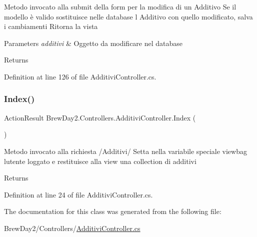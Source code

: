 Metodo invocato alla submit della form per la modifica di un Additivo Se il modello è valido sostituisce nelle database l\textquotesingle{} Additivo con quello modificato, salva i cambiamenti Ritorna la vista 


\begin{DoxyParams}{Parameters}
{\em additivi} & Oggetto da modificare nel database\\
\hline
\end{DoxyParams}
\begin{DoxyReturn}{Returns}

\end{DoxyReturn}


Definition at line 126 of file Additivi\+Controller.\+cs.

\mbox{\label{class_brew_day2_1_1_controllers_1_1_additivi_controller_abc59038a7b58a22f8300921d8c0fe72e}} 
\subsubsection{\texorpdfstring{Index()}{Index()}}
{\footnotesize\ttfamily Action\+Result Brew\+Day2.\+Controllers.\+Additivi\+Controller.\+Index (\begin{DoxyParamCaption}{ }\end{DoxyParamCaption})}



Metodo invocato alla richiesta /\+Additivi/ Setta nella variabile speciale viewbag l\textquotesingle{}utente loggato e restituisce alla view una collection di additivi 

\begin{DoxyReturn}{Returns}

\end{DoxyReturn}


Definition at line 24 of file Additivi\+Controller.\+cs.



The documentation for this class was generated from the following file\+:\begin{DoxyCompactItemize}
\item 
Brew\+Day2/\+Controllers/\mbox{\hyperlink{_additivi_controller_8cs}{Additivi\+Controller.\+cs}}\end{DoxyCompactItemize}
